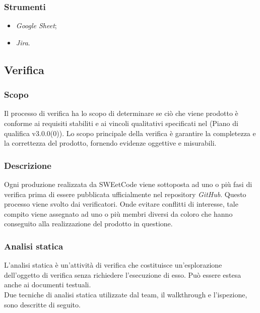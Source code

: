 \documentclass[10pt, a4paper]{article}
\begin{document}
\subsubsection{Strumenti}
\begin{itemize}
    \item \textit{Google Sheet};
    \item \textit{Jira}.
\end{itemize}

\subsection{Verifica}
\subsubsection{Scopo}
Il processo di verifica ha lo scopo di determinare se ciò che viene prodotto è conforme ai requisiti stabiliti e ai vincoli qualitativi specificati nel (Piano di qualifica v3.0.0(0)).
Lo scopo principale della verifica è garantire la completezza e la correttezza del prodotto, fornendo evidenze oggettive e misurabili.

\subsubsection{Descrizione}
Ogni produzione realizzata da SWEetCode viene sottoposta ad uno o più fasi di verifica prima di essere pubblicata ufficialmente nel repository \textit{GitHub}.
Questo processo viene svolto dai verificatori. Onde evitare conflitti di interesse, tale compito viene assegnato ad uno o più membri diversi da coloro che hanno conseguito alla realizzazione del prodotto in questione.

\subsubsection{Analisi statica}
L'analisi statica è un'attività di verifica che costituisce un'esplorazione dell'oggetto di verifica senza richiedere l'esecuzione di esso. Può essere estesa anche ai documenti testuali.\\
Due tecniche di analisi statica utilizzate dal team, il walkthrough e l'ispezione, sono descritte di seguito.
\end{document}

